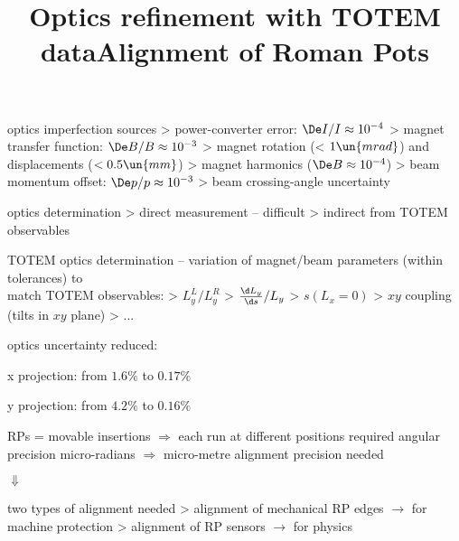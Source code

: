 \vfil
\> optics imperfection sources
\>> power-converter error: $\De I / I \approx 10^{-4}$
\>> magnet transfer function: $\De B / B \approx 10^{-3}$
\>> magnet rotation (< $1\un{mrad}$) and displacements ($<0.5\un{mm}$)
\>> magnet harmonics ($\De B \approx 10^{-4}$)
\>> beam momentum offset: $\De p / p \approx 10^{-3}$
\>> beam crossing-angle uncertainty

\vfil
\> optics determination
\>> direct measurement -- difficult
\>> indirect from TOTEM observables

\vfil
\> TOTEM optics determination -- variation of magnet/beam parameters (within tolerances) to\\ match TOTEM observables:
\>> $L_y^L / L_y^R$
\>> ${\d L_y\over \d s} / L_y$
\>> $s(L_x = 0)$
\>> $xy$ coupling (tilts in $xy$ plane)
\>> ...

\vfil


\newpage %
\title{Optics refinement with TOTEM data}

\centerline{}

\vfil
{}

\vfil

\> optics uncertainty reduced:

\centerline{x projection: from $1.6\%$ to $0.17\%$}
\centerline{y projection: from $4.2\%$ to $0.16\%$}

\vfil

{\SmallerFonts
{}

}

\vfil

\newpage %
\title{Alignment of Roman Pots}

\> RPs = movable insertions $\Rightarrow$ each run at different positions
\> required angular precision micro-radians $\Rightarrow$ micro-metre alignment precision needed

\vfil
\centerline{$\Downarrow$}
\vfil

\> two types of alignment needed
\>> alignment of mechanical RP edges $\rightarrow$ for machine protection
\>> alignment of RP sensors $\rightarrow$ for physics

